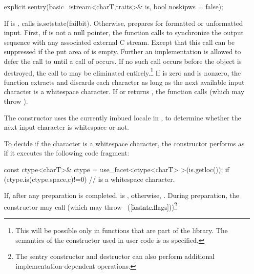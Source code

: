 %
\begin{itemdecl}
explicit sentry(basic_istream<charT,traits>& is, bool noskipws = false);
\end{itemdecl}

\begin{itemdescr}
\pnum
\effects
If
is
,
calls is.setstate(failbit). Otherwise,
prepares for formatted or
unformatted input.
First, if
is not a null pointer, the
function calls
%
to synchronize the output sequence with any associated external
C stream.
Except that this call can be suppressed if the put area of
is empty.
Further an implementation is allowed to defer the call to
until a
call of
occurs.
If no such call occurs before the
object is destroyed, the call to
may be eliminated entirely.\footnote{This will be possible only in functions
that are part of the library.
The semantics of the constructor used in user code is as specified.}
If  is zero and
is nonzero, the function extracts and discards each character as long as
the next available input character  is a whitespace character.
If
or
returns
,
the function calls
(which may throw
).

\pnum
\notes
The constructor
uses the currently imbued locale in ,
to determine whether the next input character is
whitespace or not.

\pnum
To decide if the character  is a whitespace character,
the constructor performs as if it executes the following code fragment:
\begin{codeblock}
const ctype<charT>& ctype = use_facet<ctype<charT> >(is.getloc());
if (ctype.is(ctype.space,c)!=0)
  //  is a whitespace character.
\end{codeblock}

\pnum
If, after any preparation is completed,
is
,
otherwise,
.
During preparation, the constructor may call
(which may throw
~(\ref{iostate.flags}))\footnote{The sentry
constructor and destructor
can also perform additional
%
implementation-dependent operations.}
\end{itemdescr}

